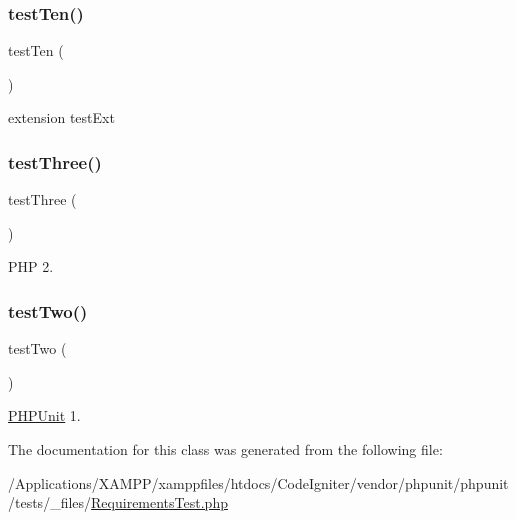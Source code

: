 \subsubsection{\texorpdfstring{test\+Ten()}{testTen()}}
{\footnotesize\ttfamily test\+Ten (\begin{DoxyParamCaption}{ }\end{DoxyParamCaption})}

extension test\+Ext \mbox{\label{class_requirements_test_a0bd6c752e665cd0e690512ca38d15d41}} 
\subsubsection{\texorpdfstring{test\+Three()}{testThree()}}
{\footnotesize\ttfamily test\+Three (\begin{DoxyParamCaption}{ }\end{DoxyParamCaption})}

P\+HP 2. \mbox{\label{class_requirements_test_a4fb9974ce113d5d1db8075e0db0dc9b6}} 
\subsubsection{\texorpdfstring{test\+Two()}{testTwo()}}
{\footnotesize\ttfamily test\+Two (\begin{DoxyParamCaption}{ }\end{DoxyParamCaption})}

\mbox{\hyperlink{namespace_p_h_p_unit}{P\+H\+P\+Unit}} 1. 

The documentation for this class was generated from the following file\+:\begin{DoxyCompactItemize}
\item 
/\+Applications/\+X\+A\+M\+P\+P/xamppfiles/htdocs/\+Code\+Igniter/vendor/phpunit/phpunit/tests/\+\_\+files/\mbox{\hyperlink{_requirements_test_8php}{Requirements\+Test.\+php}}\end{DoxyCompactItemize}
